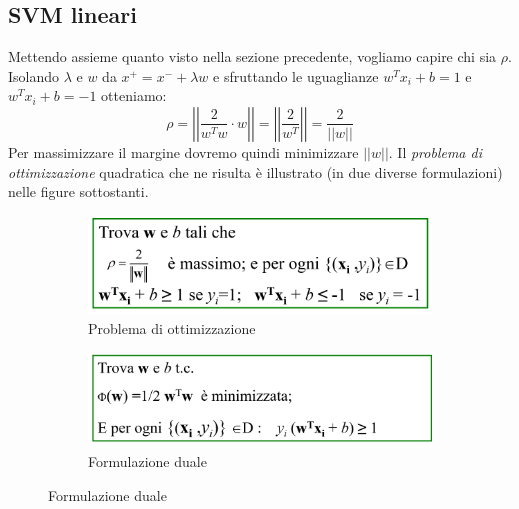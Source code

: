 \documentclass[a4paper,oneside,titlepage]{book}
\begin{document}
\subsection{SVM lineari}
Mettendo assieme quanto visto nella sezione precedente, vogliamo capire chi sia $\rho$. Isolando $\lambda$ e $w$ da $x^+ = x^- + \lambda w$ e sfruttando le uguaglianze $w^T x_i + b = 1$ e $w^T x_i + b = -1$ otteniamo:
\[ \rho = \left| \left| \frac{2}{w^T w} \cdot w \right| \right| = \left| \left| \frac{2}{w^T} \right| \right| = \frac{2}{||w||} \]
Per massimizzare il margine dovremo quindi minimizzare $||w||$. Il \textit{problema di ottimizzazione} quadratica che ne risulta è illustrato (in due diverse formulazioni) nelle figure sottostanti.
\begin{figure}[htp]
	\begin{subfigure}{0.49\textwidth}
	    \centering
		\includegraphics[width=\textwidth, height=\textheight, keepaspectratio]{svm-lin1.png}
		\caption{Problema di ottimizzazione}
	\end{subfigure}
	\hfill
	\begin{subfigure}{0.49\textwidth}
	    \centering
		\includegraphics[width=\textwidth, height=\textheight, keepaspectratio]{svm-lin2.png}
		\caption{Formulazione duale}
	\end{subfigure}
\end{figure}
\end{document}
